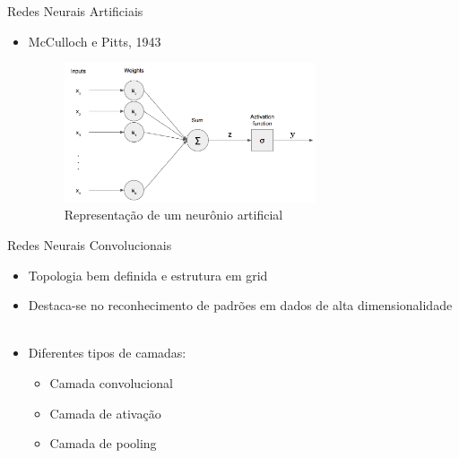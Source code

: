 

\begin{frame}{Redes Neurais Artificiais}
   \ \  \\[0.1cm]
  \begin{itemize}
  \item McCulloch e Pitts, 1943
  \begin{figure}[ht]
  	\centering
  	\label{fig:neuronio}
  	\includegraphics[width=0.7\textwidth]{img/perceptron.png}
     \caption{Representação de um neurônio artificial}
  \end{figure}
\end{itemize}
\end{frame}

\begin{frame}{Redes Neurais Convolucionais}
   \ \  \\[0.1cm]
   \begin{itemize}
     \item Topologia bem definida e estrutura em grid
    \item Destaca-se no reconhecimento de padrões em dados de alta dimensionalidade
     \ \ \newline
     \item Diferentes tipos de camadas:
     \begin{itemize}
       \item Camada convolucional
       \item Camada de ativação
       \item Camada de pooling
     \end{itemize}

   \end{itemize}
\end{frame}

